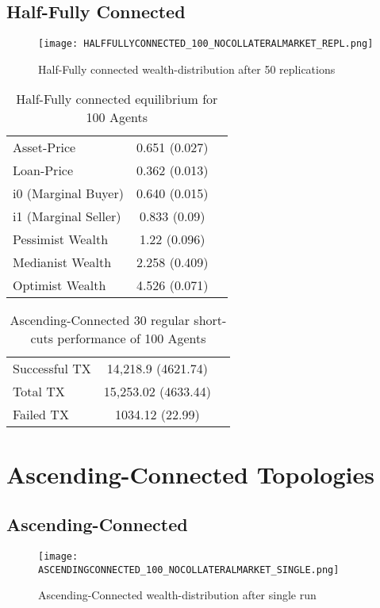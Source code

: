 \documentclass[Bachelorarbeit.tex]{subfiles}
\begin{document}
\subsection{Half-Fully Connected}
\begin{figure}[!htbp]
	\centering
  \texttt{[image: HALFFULLYCONNECTED\_100\_NOCOLLATERALMARKET\_REPL.png]}
	\caption{Half-Fully connected wealth-distribution after 50 replications}
	\label{fig1}
\end{figure}

\begin{table}[!htbp]
	\caption{Half-Fully connected equilibrium for 100 Agents}
	\centering
	\begin{tabular} { l c r }
		\hline
		Asset-Price & 0.651 (0.027) \\
		Loan-Price & 0.362 (0.013) \\
		i0 (Marginal Buyer) & 0.640 (0.015) \\
		i1 (Marginal Seller) & 0.833 (0.09) \\
		Pessimist Wealth & 1.22 (0.096) \\
		Medianist Wealth & 2.258 (0.409) \\
		Optimist Wealth & 4.526 (0.071) \\
		\hline
	\end{tabular}
\end{table} 

\begin{table}[!htbp]
	\caption{Ascending-Connected 30 regular short-cuts performance of 100 Agents}
	\centering
	\begin{tabular} { l c r }
		\hline
		Successful TX & 14,218.9 (4621.74) \\
		Total TX & 15,253.02 (4633.44) \\
		Failed TX & 1034.12 (22.99) \\
		\hline
	\end{tabular}
\end{table}

\section{Ascending-Connected Topologies} 

\subsection{Ascending-Connected}
\begin{figure}[!htbp]
	\centering
  \texttt{[image: ASCENDINGCONNECTED\_100\_NOCOLLATERALMARKET\_SINGLE.png]}
	\caption{Ascending-Connected wealth-distribution after single run}
	\label{fig1}
\end{figure}
\end{document}
